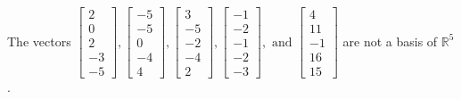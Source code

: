 \begin{exercise}
\begin{exerciseStatement}
  \end{exerciseStatement}
  \begin{exerciseAnswer}
   The vectors \(\left[\begin{array}{r}
2 \\
0 \\
2 \\
-3 \\
-5
\end{array}\right] , \left[\begin{array}{r}
-5 \\
-5 \\
0 \\
-4 \\
4
\end{array}\right] , \left[\begin{array}{r}
3 \\
-5 \\
-2 \\
-4 \\
2
\end{array}\right] , \left[\begin{array}{r}
-1 \\
-2 \\
-1 \\
-2 \\
-3
\end{array}\right] , \text{ and } \left[\begin{array}{r}
4 \\
11 \\
-1 \\
16 \\
15
\end{array}\right]\) 
  	 are not  a basis of \(\mathbb{R}^5\).
  


  \end{exerciseAnswer}
\end{exercise}